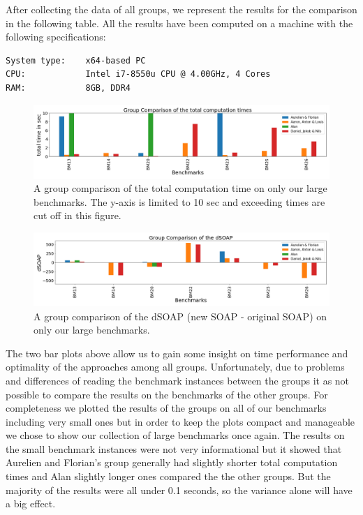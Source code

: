 \documentclass{llncs}
\begin{document}
After collecting the data of all groups, we represent the results for the comparison in the following table. All the results have been computed on a machine with the following specifications:
\begin{verbatim}
System type:    x64-based PC
CPU:            Intel i7-8550u CPU @ 4.00GHz, 4 Cores
RAM:            8GB, DDR4
\end{verbatim}
\newpage
\begin{figure}
    \centering
    \includegraphics[scale=0.24]{images/comparison/group_comparison_total.png}
    \caption{A group comparison of the total computation time on only our large benchmarks. The y-axis is limited to 10 sec and exceeding times are cut off in this figure.}
    \label{fig:my_label}
\end{figure}
\begin{figure}
    \centering
    \includegraphics[scale=0.24]{images/comparison/group_comparison_SOAP.png}
    \caption{A group comparison of the dSOAP (new SOAP - original SOAP) on only our large benchmarks.}
    \label{fig:my_label}
\end{figure}

The two bar plots above allow us to gain some insight on time performance and optimality of the approaches among all groups. Unfortunately, due to problems and differences of reading the benchmark instances between the groups it as not possible to compare the results on the benchmarks of the other groups. For completeness we plotted the results of the groups on all of our benchmarks including very small ones but in order to keep the plots compact and manageable we chose to show our collection of large benchmarks once again. The results on the small benchmark instances were not very informational but it showed that Aurelien and Florian's group \cite{project2} generally had slightly shorter total computation times and Alan \cite{project3} slightly longer ones compared the the other groups. But the majority of the results were all under 0.1 seconds, so the variance alone will have a big effect.
\end{document}

